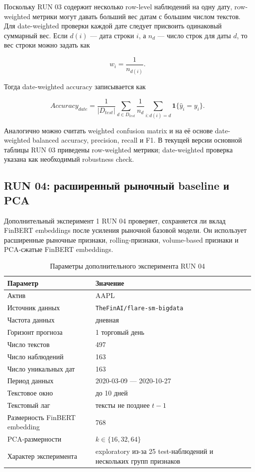 Поскольку RUN 03 содержит несколько row-level наблюдений на одну дату, row-weighted метрики могут давать больший вес датам с большим числом текстов. Для date-weighted проверки каждой дате следует присвоить одинаковый суммарный вес. Если $d(i)$ --- дата строки $i$, а $n_d$ --- число строк для даты $d$, то вес строки можно задать как

\[
w_i=\frac{1}{n_{d(i)}}.
\]

Тогда date-weighted accuracy записывается как

\[
Accuracy_{date}=\frac{1}{|D_{test}|}\sum_{d\in D_{test}}\frac{1}{n_d}\sum_{i:d(i)=d}\mathbf{1}\{\widehat y_i=y_i\}.
\]

Аналогично можно считать weighted confusion matrix и на её основе date-weighted balanced accuracy, precision, recall и F1. В текущей версии основной таблицы RUN 03 приведены row-weighted метрики; date-weighted проверка указана как необходимый robustness check.

\subsection*{RUN 04: расширенный рыночный baseline и PCA}

Дополнительный эксперимент 1 RUN 04 проверяет, сохраняется ли вклад FinBERT embeddings после усиления рыночной базовой модели. Он использует расширенные рыночные признаки, rolling-признаки, volume-based признаки и PCA-сжатые FinBERT embeddings.

\begin{table}[htbp]
\centering
\begin{tabular}{ll}
\toprule
Параметр & Значение \\
\midrule
Актив & AAPL \\
Источник данных & \texttt{TheFinAI/flare-sm-bigdata} \\
Частота данных & дневная \\
Горизонт прогноза & 1 торговый день \\
Число текстов & 497 \\
Число наблюдений & 163 \\
Число уникальных дат & 163 \\
Период данных & 2020-03-09 --- 2020-10-27 \\
Текстовое окно & до 10 дней \\
Текстовый лаг & тексты не позднее $t-1$ \\
Размерность FinBERT embedding & 768 \\
PCA-размерности & $k \in \{16,32,64\}$ \\
Характер эксперимента & exploratory из-за 25 test-наблюдений и нескольких групп признаков \\
\bottomrule
\end{tabular}
\caption{Параметры дополнительного эксперимента RUN 04}
\label{tab:appendix_run04_params}
\end{table}

